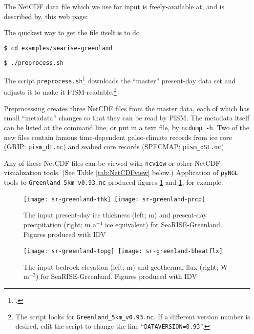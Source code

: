 The NetCDF data file which we use for input is freely-available at, and is described by, this web page: 
\medskip

\centerline{}
\medskip

\noindent The quickest way to get the file itself is to do

\verb|$ cd examples/searise-greenland|

\verb|$ ./preprocess.sh|

\noindent The script \verb|preprocess.sh|\footnote{.} downloads the ``master'' present-day data set and adjusts it to make it PISM-readable.\footnote{The script looks for \texttt{Greenland\_5km\_v0.93.nc}.  If a different version number is desired, edit the script to change the line ``\texttt{DATAVERSION=0.93}''.}

Preprocessing creates three NetCDF files from the master data, each of which has small ``metadata'' changes so that they can be read by PISM.  The metadata itself can be listed at the command line, or put in a text file, by \verb|ncdump -h|.  Two of the new files contain famous time-dependent paleo-climate records from ice core (GRIP; \verb|pism_dT.nc|) and seabed core records (SPECMAP; \verb|pism_dSL.nc|).

Any of these NetCDF files can be viewed with \verb|ncview| or other NetCDF visualization tools.  (See Table \ref{tab:NetCDFview} below.)  Application of \verb|pyNGL| tools to \verb|Greenland_5km_v0.93.nc| produced figures \ref{fig:sr-input1} and  \ref{fig:sr-input1}, for example.

\begin{figure}[ht]
\centering
\mbox{\texttt{[image: sr-greenland-thk]}
 \qquad\qquad\texttt{[image: sr-greenland-prcp]}}
\caption{The input present-day ice thickness (left; m) and present-day precipitation (right; m $\text{a}^{-1}$ ice equivalent) for SeaRISE-Greenland.  Figures produced with IDV}
\label{fig:sr-input1}
\end{figure}

\begin{figure}[ht]
\centering
\mbox{\texttt{[image: sr-greenland-topg]}
 \qquad\quad \texttt{[image: sr-greenland-bheatflx]}}
\caption{The input bedrock elevation (left; m) and geothermal flux (right; W $\text{m}^{-2}$) for SeaRISE-Greenland.  Figures produced with IDV}
\label{fig:sr-input2}
\end{figure}


